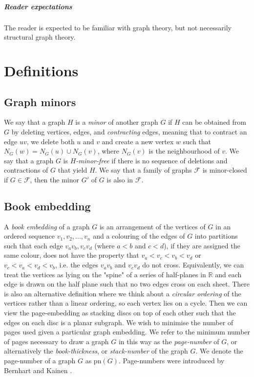 \documentclass[]{report}
\newcommand{\pn}{\text{pn}}
\theoremstyle{definition}
\numberwithin{theorem}{section}
\numberwithin{equation}{section}
\begin{document}
\paragraph{Reader expectations}
The reader is expected to be familiar with graph theory, but not necessarily structural graph theory.

\chapter{Definitions}\label{chap:Definitions}
\section{Graph minors}
We say that a graph $H$ is a \textit{minor} of another graph $G$ if $H$ can be obtained from $G$ by deleting vertices, edges, and \textit{contracting} edges, meaning that to contract an edge $uv$, we delete both $u$ and $v$ and create a new vertex $w$ such that $N_G(w) = N_G(u) \cup N_G(v)$, where $N_G(v)$ is the neighbourhood of $v$. We say that a graph $G$ is \textit{$H$-minor-free} if there is no sequence of deletions and contractions of $G$ that yield $H$. We say that a family of graphs $\mathcal{F}$ is minor-closed if $G \in \mathcal{F}$, then the minor $G'$ of $G$ is also in $\mathcal{F}$. 
\section{Book embedding}\label{ssec:Book Embedding}
A \textit{book embedding} of a graph $G$ is an arrangement of the vertices of $G$ in an ordered sequence $v_1, v_2, ..., v_n$ and a colouring of the edges of $G$ into partitions such that each edge $v_av_b, v_c v_d$ (where $a < b$ and $c < d$), if they are assigned the same colour, does not have the property that $v_a < v_c < v_b < v_d$ or $v_c < v_a < v_d < v_b$, i.e. the edges $v_a v_b$ and $v_c v_d$ do not cross. Equivalently, we can treat the vertices as lying on the "spine" of a series of half-planes in $\mathbb{R}$ and each edge is drawn on the half plane such that no two edges cross on each sheet. There is also an alternative definition where we think about a \textit{circular ordering} of the vertices rather than a linear ordering, so each vertex lies on a cycle. Then we can view the page-embedding as stacking discs on top of each other such that the edges on each disc is a planar subgraph. We wish to minimise the number of pages used given a particular graph embedding. We refer to the minimum number of pages necessary to draw a graph $G$ in this way as the \textit{page-number} of $G$, or alternatively the \textit{book-thickness}, or \textit{stack-number} of the graph $G$. We denote the page-number of a graph $G$ as $\pn(G)$. Page-numbers were introduced by Bernhart and Kainen \cite{bernhartBookThicknessGraph1979}.
\end{document}
